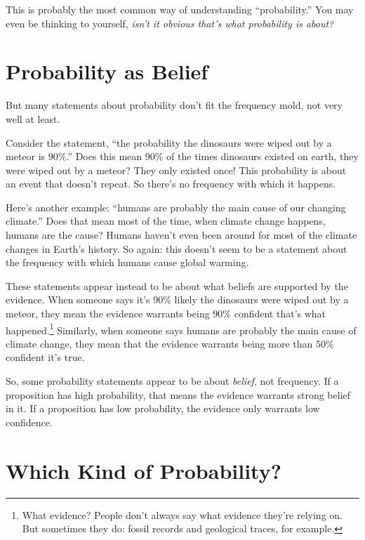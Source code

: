 \documentclass[justified]{tufte-book}
\theoremstyle{definition}
\theoremstyle{definition}
\theoremstyle{definition}
\theoremstyle{definition}
\theoremstyle{remark}
\begin{document}
This is probably the most common way of understanding ``probability.'' You may even be thinking to yourself, \emph{isn't it obvious that's what probability is about?}

\hypertarget{probability-as-belief}{%
\section{Probability as Belief}\label{probability-as-belief}}

But many statements about probability don't fit the frequency mold, not very well at least.

Consider the statement, ``the probability the dinosaurs were wiped out by a meteor is \(90\%\).'' Does this mean \(90\%\) of the times dinosaurs existed on earth, they were wiped out by a meteor? They only existed once! This probability is about an event that doesn't repeat. So there's no frequency with which it happens.

Here's another example: ``humans are probably the main cause of our changing climate.'' Does that mean most of the time, when climate change happens, humans are the cause? Humans haven't even been around for most of the climate changes in Earth's history. So again: this doesn't seem to be a statement about the frequency with which humans cause global warming.

These statements appear instead to be about what beliefs are supported by the evidence. When someone says it's \(90\%\) likely the dinosaurs were wiped out by a meteor, they mean the evidence warrants being \(90\%\) confident that's what happened.\footnote{What evidence? People don't always say what evidence they're relying on. But sometimes they do: fossil records and geological traces, for example.} Similarly, when someone says humans are probably the main cause of climate change, they mean that the evidence warrants being more than \(50\%\) confident it's true.

So, some probability statements appear to be about \emph{belief}, not frequency. If a proposition has high probability, that means the evidence warrants strong belief in it. If a proposition has low probability, the evidence only warrants low confidence.

\hypertarget{which-kind-of-probability}{%
\section{Which Kind of Probability?}\label{which-kind-of-probability}}
\end{document}
